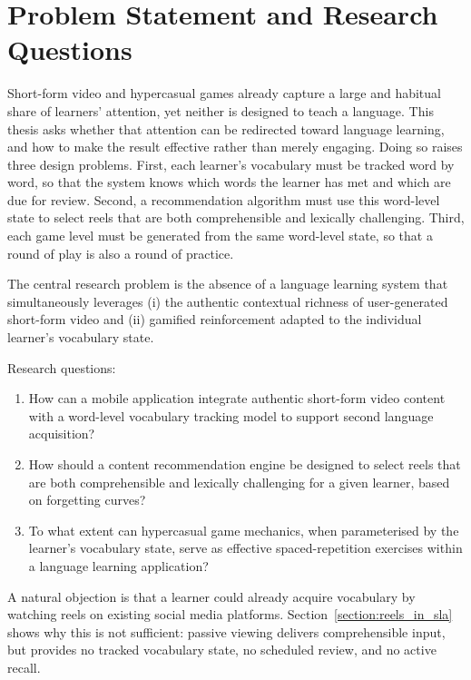 \section{Problem Statement and Research Questions}
Short-form video and hypercasual games already capture a large and habitual share of learners' attention, yet neither is designed to teach a language. This thesis asks whether that attention can be redirected toward language learning, and how to make the result effective rather than merely engaging. Doing so raises three design problems. First, each learner's vocabulary must be tracked word by word, so that the system knows which words the learner has met and which are due for review. Second, a recommendation algorithm must use this word-level state to select reels that are both comprehensible and lexically challenging. Third, each game level must be generated from the same word-level state, so that a round of play is also a round of practice.

The central research problem is the absence of a language learning system that simultaneously leverages (i) the authentic contextual richness of user-generated short-form video and (ii) gamified reinforcement adapted to the individual learner's vocabulary state.

Research questions:

\begin{enumerate}
    \item[\textbf{RQ1.}] How can a mobile application integrate authentic short-form video content with a word-level vocabulary tracking model to support second language acquisition?
    \item[\textbf{RQ2.}] How should a content recommendation engine be designed to select reels that are both comprehensible and lexically challenging for a given learner, based on forgetting curves?
    \item[\textbf{RQ3.}] To what extent can hypercasual game mechanics, when parameterised by the learner's vocabulary state, serve as effective spaced-repetition exercises within a language learning application?
\end{enumerate}

A natural objection is that a learner could already acquire vocabulary by watching reels on existing social media platforms. Section~\ref{section:reels_in_sla} shows why this is not sufficient: passive viewing delivers comprehensible input, but provides no tracked vocabulary state, no scheduled review, and no active recall.

